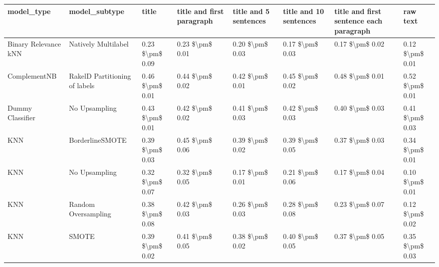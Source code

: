 \begin{tabular}{llllllll}
\toprule
                     model\_type &                 model\_subtype &           title & title and first paragraph & title and 5 sentences & title and 10 sentences & title and first sentence each paragraph &            raw text \\
\midrule
           Binary Relevance kNN &           Natively Multilabel & 0.23 \$\textbackslash pm\$ 0.09 &           0.23 \$\textbackslash pm\$ 0.01 &       0.20 \$\textbackslash pm\$ 0.03 &        0.17 \$\textbackslash pm\$ 0.03 &                         0.17 \$\textbackslash pm\$ 0.02 &     0.12 \$\textbackslash pm\$ 0.01 \\
                   ComplementNB & RakelD Partitioning of labels & 0.46 \$\textbackslash pm\$ 0.01 &           0.44 \$\textbackslash pm\$ 0.02 &       0.42 \$\textbackslash pm\$ 0.01 &        0.45 \$\textbackslash pm\$ 0.02 &                         0.48 \$\textbackslash pm\$ 0.01 &     0.52 \$\textbackslash pm\$ 0.01 \\
               Dummy Classifier &                 No Upsampling & 0.43 \$\textbackslash pm\$ 0.01 &           0.42 \$\textbackslash pm\$ 0.02 &       0.41 \$\textbackslash pm\$ 0.03 &        0.42 \$\textbackslash pm\$ 0.03 &                         0.40 \$\textbackslash pm\$ 0.03 &     0.41 \$\textbackslash pm\$ 0.03 \\
                            KNN &               BorderlineSMOTE & 0.39 \$\textbackslash pm\$ 0.03 &           0.45 \$\textbackslash pm\$ 0.06 &       0.39 \$\textbackslash pm\$ 0.02 &        0.39 \$\textbackslash pm\$ 0.05 &                         0.37 \$\textbackslash pm\$ 0.03 &     0.34 \$\textbackslash pm\$ 0.01 \\
                            KNN &                 No Upsampling & 0.32 \$\textbackslash pm\$ 0.07 &           0.32 \$\textbackslash pm\$ 0.05 &       0.17 \$\textbackslash pm\$ 0.01 &        0.21 \$\textbackslash pm\$ 0.06 &                         0.17 \$\textbackslash pm\$ 0.04 &     0.10 \$\textbackslash pm\$ 0.01 \\
                            KNN &           Random Oversampling & 0.38 \$\textbackslash pm\$ 0.08 &           0.42 \$\textbackslash pm\$ 0.03 &       0.26 \$\textbackslash pm\$ 0.03 &        0.28 \$\textbackslash pm\$ 0.08 &                         0.23 \$\textbackslash pm\$ 0.07 &     0.12 \$\textbackslash pm\$ 0.02 \\
                            KNN &                         SMOTE & 0.39 \$\textbackslash pm\$ 0.02 &           0.41 \$\textbackslash pm\$ 0.05 &       0.38 \$\textbackslash pm\$ 0.02 &        0.40 \$\textbackslash pm\$ 0.05 &                         0.37 \$\textbackslash pm\$ 0.05 &     0.35 \$\textbackslash pm\$ 0.03 \\

\end{tabular}
